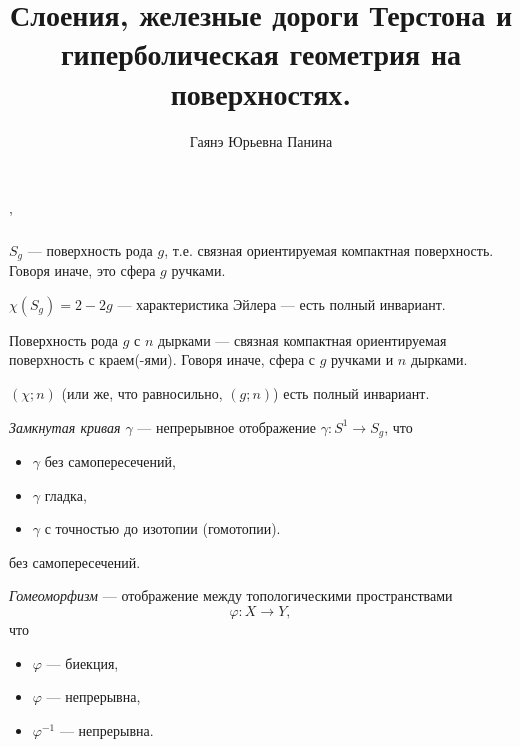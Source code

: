 \documentclass[12pt,a4paper]{article}
\title{Слоения, железные дороги Терстона и гиперболическая геометрия на поверхностях.}
\author{Гаянэ Юрьевна Панина}
\begin{document}
    \maketitle'

    \begin{definition}
        $S_g$ --- поверхность рода $g$, т.е. связная ориентируемая компактная поверхность. Говоря иначе, это сфера $g$ ручками.
    \end{definition}

    \begin{lemma}
        $\chi(S_g) = 2 - 2g$ --- характеристика Эйлера --- есть полный инвариант.
    \end{lemma}

    \begin{definition}
        Поверхность рода $g$ с $n$ дырками --- связная компактная ориентируемая поверхность с краем(-ями). Говоря иначе, сфера с $g$ ручками и $n$ дырками.
    \end{definition}

    \begin{lemma}
        $(\chi; n)$ (или же, что равносильно, $(g; n)$) есть полный инвариант.
    \end{lemma}

    \begin{definition}
        \emph{Замкнутая кривая $\gamma$} --- непрерывное отображение $\gamma: S^1 \to S_g$, что
        \begin{itemize}
            \item $\gamma$ без самопересечений,
            \item $\gamma$ гладка,
            \item $\gamma$ с точностью до изотопии (гомотопии).
        \end{itemize} без самопересечений.
    \end{definition}

    \begin{definition}
        \emph{Гомеоморфизм} --- отображение между топологическими пространствами
        \[\varphi: X \to Y,\]
        что
        \begin{itemize}
            \item $\varphi$ --- биекция,
            \item $\varphi$ --- непрерывна,
            \item $\varphi^{-1}$ --- непрерывна.
        \end{itemize}
    \end{definition}
\end{document}
